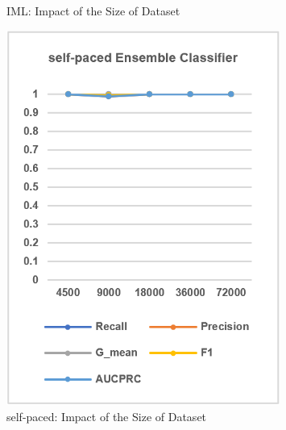 \begin{figure}[H]
\begin{minipage}{0.31\textwidth}
        \caption{IML: Impact of the Size of Dataset}
        \label{fig19}
    \end{minipage}
    \hspace{5pt}
    \begin{minipage}{0.31\textwidth}
        \centering
        \includegraphics[width=0.8\textwidth]{images/fig20}
        \caption{self-paced: Impact of the Size of Dataset}
        \label{fig20}
    \end{minipage}
\end{figure}
\vspace{-10pt}

